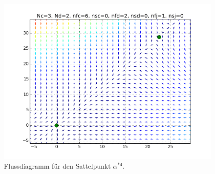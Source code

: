 \begin{figure}
 \centering
 \includegraphics[scale = 0.5]{abschnitte/beta_QCDxdQCD/fig/RG_flow3_2_6_0_2_0_1_0.png}
 \caption{Flussdiagramm für den Sattelpunkt $\alpha^{*4}$.}
 \label{fig:beta_QCDxdQCD:Sattelpunkt1}
\end{figure}
